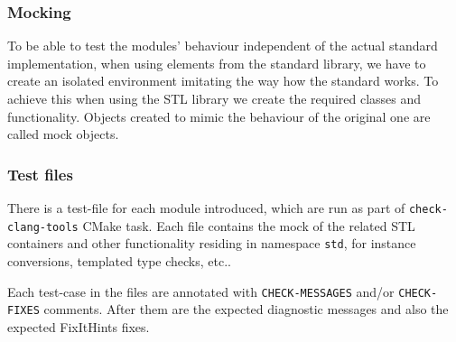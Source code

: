 \subsubsection{Mocking}
\par To be able to test the modules' behaviour independent of the actual standard implementation, when using elements from the standard library, we have to create an isolated environment imitating the way how the standard works. To achieve this when using the STL library we create the required classes and functionality. Objects created to mimic the behaviour of the original one are called mock objects.
\subsubsection{Test files}
\par There is a test-file for each module introduced, which are run as part of \verb|check-clang-tools| CMake task. Each file contains the mock of the related STL containers and other functionality residing in namespace \verb|std|, for instance conversions, templated type checks, etc.. \medskip
\par Each test-case in the files are annotated with \verb|CHECK-MESSAGES| and/or \verb|CHECK-FIXES| comments. After them are the expected diagnostic messages and also the expected FixItHints fixes.